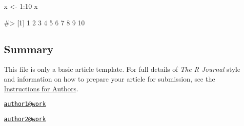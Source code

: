 \begin{Schunk}
\begin{Sinput}
x <- 1:10
x
\end{Sinput}
\begin{Soutput}
#>  [1]  1  2  3  4  5  6  7  8  9 10
\end{Soutput}
\end{Schunk}

\subsection{Summary}\label{summary}

This file is only a basic article template. For full details of
\emph{The R Journal} style and information on how to prepare your
article for submission, see the
\href{https://journal.r-project.org/share/author-guide.pdf}{Instructions
for Authors}. 

\address{%
Author One\\
Affiliation\\
line 1\\ line 2\\
}
\href{mailto:author1@work}{\nolinkurl{author1@work}}

\address{%
Author Two\\
Affiliation\\
line 1\\ line 2\\
}
\href{mailto:author2@work}{\nolinkurl{author2@work}}

